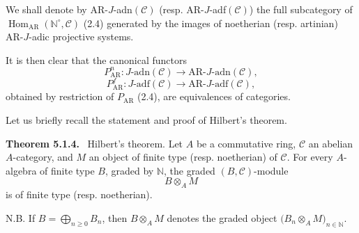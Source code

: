 \documentclass[11pt]{article}
\newenvironment{statement}[1]{\par\medskip\noindent\textbf{#1.}\ }{\par\medskip}
\DeclareMathOperator{\Hom}{Hom}
\providecommand{\Hom}{\operatorname{Hom}}
\begin{document}
We shall denote by AR-\(J\)-adn\((\mathcal C)\) (resp. AR-\(J\)-adf\((\mathcal C)\)) the full subcategory of \(\Hom_{\mathrm{AR}}(\mathbb N^\circ,\mathcal C)\) (2.4) generated by the images of noetherian (resp. artinian) AR-\(J\)-adic projective systems.

It is then clear that the canonical functors
\[
P^n_{\mathrm{AR}}:J\text{-adn}(\mathcal C)\longrightarrow \mathrm{AR}\text{-}J\text{-adn}(\mathcal C),
\]
\[
P^f_{\mathrm{AR}}:J\text{-adf}(\mathcal C)\longrightarrow \mathrm{AR}\text{-}J\text{-adf}(\mathcal C),
\]
obtained by restriction of \(P_{\mathrm{AR}}\) (2.4), are equivalences of categories.

Let us briefly recall the statement and proof of Hilbert's theorem.

\begin{statement}{Theorem 5.1.4}
Hilbert's theorem. Let \(A\) be a commutative ring, \(\mathcal C\) an abelian \(A\)-category, and \(M\) an object of finite type (resp. noetherian) of \(\mathcal C\). For every \(A\)-algebra of finite type \(B\), graded by \(\mathbb N\), the graded \((B,\mathcal C)\)-module
\[
B\otimes_A M
\]
is of finite type (resp. noetherian).

N.B. If \(B=\bigoplus_{n\ge0}B_n\), then \(B\otimes_A M\) denotes the graded object \(\bigl(B_n\otimes_A M\bigr)_{n\in\mathbb N}\).
\end{statement}
\end{document}
